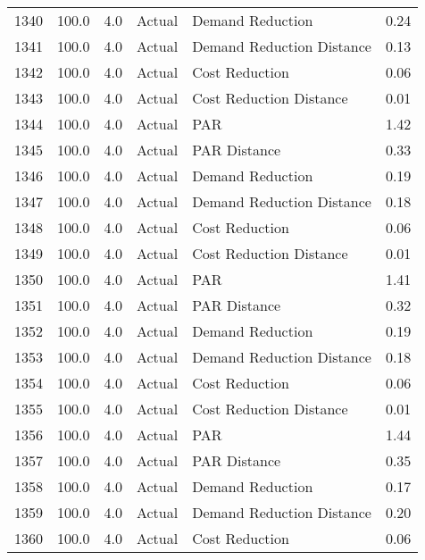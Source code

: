 \begin{longtable}{lrrllr}
1340 &        100.0 &     4.0 &         Actual &           Demand Reduction &   0.24 \\
1341 &        100.0 &     4.0 &         Actual &  Demand Reduction Distance &   0.13 \\
1342 &        100.0 &     4.0 &         Actual &             Cost Reduction &   0.06 \\
1343 &        100.0 &     4.0 &         Actual &    Cost Reduction Distance &   0.01 \\
1344 &        100.0 &     4.0 &         Actual &                        PAR &   1.42 \\
1345 &        100.0 &     4.0 &         Actual &               PAR Distance &   0.33 \\
1346 &        100.0 &     4.0 &         Actual &           Demand Reduction &   0.19 \\
1347 &        100.0 &     4.0 &         Actual &  Demand Reduction Distance &   0.18 \\
1348 &        100.0 &     4.0 &         Actual &             Cost Reduction &   0.06 \\
1349 &        100.0 &     4.0 &         Actual &    Cost Reduction Distance &   0.01 \\
1350 &        100.0 &     4.0 &         Actual &                        PAR &   1.41 \\
1351 &        100.0 &     4.0 &         Actual &               PAR Distance &   0.32 \\
1352 &        100.0 &     4.0 &         Actual &           Demand Reduction &   0.19 \\
1353 &        100.0 &     4.0 &         Actual &  Demand Reduction Distance &   0.18 \\
1354 &        100.0 &     4.0 &         Actual &             Cost Reduction &   0.06 \\
1355 &        100.0 &     4.0 &         Actual &    Cost Reduction Distance &   0.01 \\
1356 &        100.0 &     4.0 &         Actual &                        PAR &   1.44 \\
1357 &        100.0 &     4.0 &         Actual &               PAR Distance &   0.35 \\
1358 &        100.0 &     4.0 &         Actual &           Demand Reduction &   0.17 \\
1359 &        100.0 &     4.0 &         Actual &  Demand Reduction Distance &   0.20 \\
1360 &        100.0 &     4.0 &         Actual &             Cost Reduction &   0.06 \\

\end{longtable}
